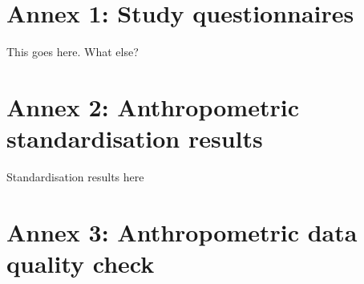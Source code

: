 \documentclass[12pt,a4paper]{article}
\begin{document}
\newpage

\hypertarget{annex-1-study-questionnaires}{%
\section*{Annex 1: Study questionnaires}\label{annex-1-study-questionnaires}}

This goes here. What else?

\newpage

\hypertarget{annex-2-anthropometric-standardisation-results}{%
\section*{Annex 2: Anthropometric standardisation results}\label{annex-2-anthropometric-standardisation-results}}

Standardisation results here

\newpage

\hypertarget{annex-3-anthropometric-data-quality-check}{%
\section*{Annex 3: Anthropometric data quality check}\label{annex-3-anthropometric-data-quality-check}}

\newpage

\renewcommand\refname{References}

\end{document}
